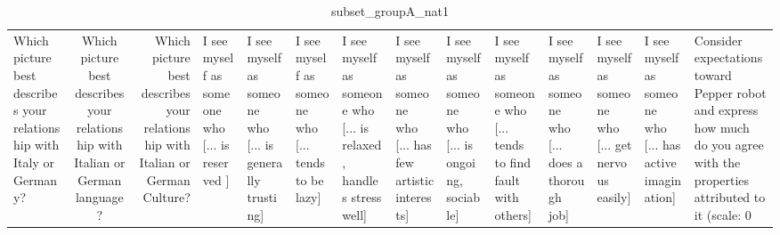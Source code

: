 \begin{table}
\caption{subset_groupA_nat1}
\label{tab:subset_groupA_nat1}
\begin{tabular}{lcr}
\toprule
Which picture best describes your relationship with Italy or Germany? & Which picture best describes your relationship with Italian or German language? & Which picture best describes your relationship with Italian or German Culture? & I see myself as someone who  [... is reserved ] & I see myself as someone who  [... is generally trusting] & I see myself as someone who  [... tends to be lazy] & I see myself as someone who  [... is relaxed, handles stress well] & I see myself as someone who  [... has few artistic interests] & I see myself as someone who  [... is ongoing, sociable] & I see myself as someone who  [... tends to find fault with others] & I see myself as someone who  [... does a thorough job] & I see myself as someone who  [... get nervous easily] & I see myself as someone who  [... has active imagination] & Consider expectations toward Pepper robot and express how much do you agree with the properties attributed to it (scale: 0%
\end{tabular}
\end{table}
